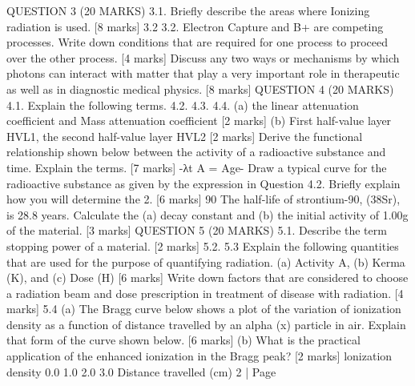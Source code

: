 \documentclass[addpoints]{exam}
\begin{document}
\begin{questions}
\begin{parts}
QUESTION 3 (20 MARKS)
3.1. Briefly describe the areas where Ionizing radiation is used. [8 marks]
3.2
3.2.
Electron Capture and B+ are competing processes. Write down conditions that are required for one process to proceed over the other process. [4 marks]
Discuss any two ways or mechanisms by which photons can interact with matter that play a very important role in therapeutic as well as in diagnostic medical physics. [8 marks]
QUESTION 4 (20 MARKS)
4.1. Explain the following terms.
4.2.
4.3.
4.4.
(a) the linear attenuation coefficient and Mass attenuation coefficient [2 marks]
(b) First half-value layer HVL1, the second half-value layer HVL2 [2 marks]
Derive the functional relationship shown below between the activity of a radioactive substance and time. Explain the terms. [7 marks]
-λt
A = Age-
Draw a typical curve for the radioactive substance as given by the expression in Question 4.2. Briefly explain how you will determine the 2. [6 marks]
90
The half-life of strontium-90, (38Sr), is 28.8 years. Calculate the (a) decay constant and (b) the initial activity of 1.00g of the material. [3 marks]
QUESTION 5 (20 MARKS)
5.1.
Describe the term stopping power of a material. [2 marks]
5.2.
5.3
Explain the following quantities that are used for the purpose of quantifying radiation. (a) Activity A,
(b) Kerma (K),
and (c) Dose (H) [6 marks]
Write down factors that are considered to choose a radiation beam and dose prescription in treatment of disease with radiation. [4 marks]
5.4 (a) The Bragg curve below shows a plot of the variation of ionization density as a function of distance travelled by an alpha (x) particle in air. Explain that form of the curve shown below. [6 marks]
(b) What is the practical application of the enhanced ionization in the Bragg peak? [2 marks]
lonization density
0.0
1.0
2.0
3.0
Distance travelled (cm)
2 | Page
﻿


\end{parts}
\end{questions}
\end{document}
